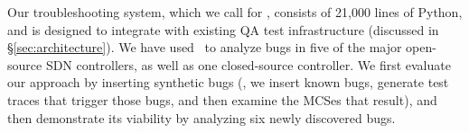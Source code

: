 Our troubleshooting system, which we call {\projectname} for \projectmeaning,
consists of 21,000 lines of Python, and is designed to
integrate with existing QA test infrastructure (discussed in
\S\ref{sec:architecture}). We
have used \projectname~to analyze bugs in \num{five} of the major open-source SDN
controllers, as well as one closed-source controller. We first evaluate
our approach by inserting synthetic bugs (\ie, we insert known
bugs, generate test traces that trigger those bugs, and then examine the MCSes that
result), and then demonstrate its viability by analyzing \num{six} newly discovered bugs.
